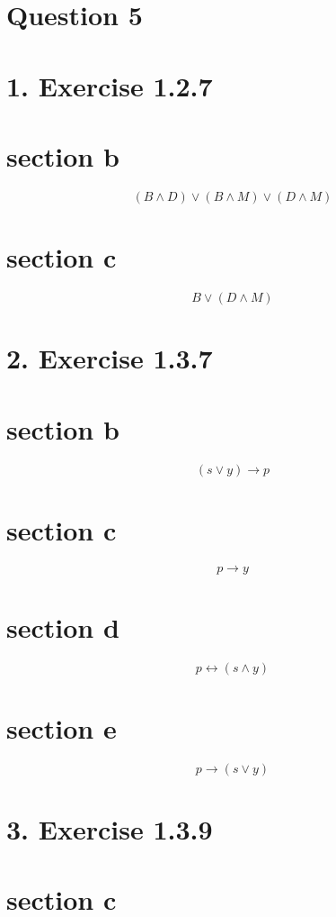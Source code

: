 \documentclass[10pt]{article}
\begin{document}
\pagebreak
\section*{Question 5}
\section*{1. Exercise 1.2.7}
\section*{section b}

$$
(B \wedge D) \vee(B \wedge M) \vee(D \wedge M)
$$

\section*{section c}

$$
B \vee(D \wedge M)
$$

\section*{2. Exercise 1.3.7}
\section*{section b}

$$
(s \vee y) \rightarrow p
$$

\section*{section c}

$$
p \rightarrow y
$$

\section*{section d}

$$
p \leftrightarrow(s \wedge y)
$$

\section*{section e}

$$
p \rightarrow(s \vee y)
$$

\section*{3. Exercise 1.3.9}
\section*{section c}
\end{document}
